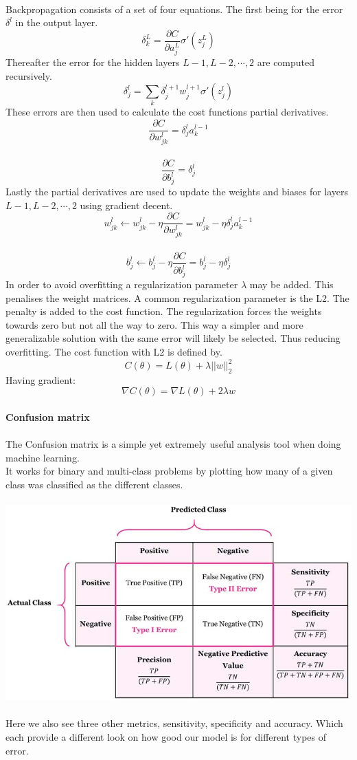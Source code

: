 \documentclass[12pt, letterpaper, twoside]{article}
\begin{document}
\ \\
Backpropagation consists of a set of four equations. The first being for the error $\delta^l$ in the output layer.\\
$$
\delta_k^L = \frac{\partial C}{\partial a_j^L}\sigma'(z_j^L)
$$
Thereafter the error for the hidden layers $L-1, L-2,\cdots,2$ are computed recursively.\\
$$
\delta_j^l = \sum_k \delta_j^{l+1} w_j^{l+1} \sigma'(z_j^{l})
$$
These errors are then used to calculate the cost functions partial derivatives.\\
$$
\frac{\partial C}{\partial w_{jk}^{l}} = \delta_j^l a_k^{l-1}
$$
\ \\
$$
\frac{\partial C}{\partial b_j^l} = \delta_j^l
$$
Lastly the partial derivatives are used to update the weights and biases for layers $L-1,L-2,\cdots,2$ using gradient decent.\\
$$
w_{jk}^l \leftarrow w_{jk}^l - \eta \frac{\partial C}{\partial w_{jk}^l}
= w_{jk}^l - \eta \delta_j^l a_{k}^{l-1}
$$
\ \\
$$
b_j^l \leftarrow b_j^l - \eta \frac{\partial C}{\partial b_j^l}
= b_j^l - \eta \delta_j^l
$$
In order to avoid overfitting a regularization parameter $\lambda$ may be added. This penalises the weight matrices. A common regularization parameter is the L2. The penalty is added to the cost function. The regularization forces the weights towards zero but not all the way to zero. This way a simpler and more generalizable solution with the same error will likely be selected. Thus reducing overfitting. The cost function with L2 is defined by.
$$
C(\theta) = L(\theta) + \lambda||w||_2^2
$$
Having gradient:
$$
\nabla C(\theta) = \nabla L(\theta) + 2 \lambda w
$$
\newpage
\ \\
\textbf{Confusion matrix}\\
\ \\
The Confusion matrix is a simple yet extremely useful analysis tool when doing machine learning.\\
It works for binary and multi-class problems by plotting how many of a given class was classified as the different classes.\\
\ \\
\includegraphics[scale=0.75]{"CM.jpg"}\\
\ \\
Here we also see three other metrics, sensitivity, specificity and accuracy. Which each provide a different look on how good our model is for different types of error.\\
\end{document}
